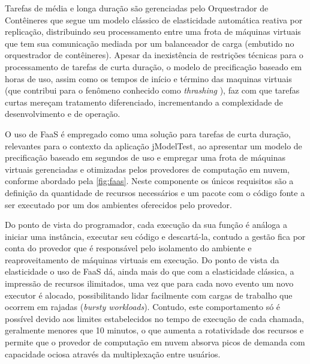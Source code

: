 \documentclass[english,brazilian]{UNISINOSmonografia} %
\begin{document}
Tarefas de média e longa duração são gerenciadas pelo Orquestrador de Contêineres que segue um modelo clássico de elasticidade automática reativa por replicação, distribuindo seu processamento entre uma frota de máquinas virtuais que tem sua comunicação mediada por um balanceador de carga (embutido no orquestrador de contêineres).
Apesar da inexistência de restrições técnicas para o processamento de tarefas de curta duração, o modelo de precificação baseado em horas de uso, assim como os tempos de início e término das maquinas virtuais (que contribui para o fenômeno conhecido como \textit{thrashing} \cite{Bersani2014}), faz com que tarefas curtas mereçam tratamento diferenciado, incrementando a complexidade de desenvolvimento e de operação.


O uso de FaaS é empregado como uma solução para tarefas de curta duração, relevantes para o contexto da aplicação jModelTest, ao apresentar um modelo de precificação baseado em segundos de uso e empregar uma frota de máquinas virtuais gerenciadas e otimizadas pelos provedores de computação em nuvem, conforme abordado pela \autoref{fig:faas}.
Neste componente os únicos requisitos são a definição da quantidade de recursos necessários e um pacote com o código fonte a ser executado por um dos ambientes oferecidos pelo provedor.


Do ponto de vista do programador, cada execução da sua função é análoga a iniciar uma instância, executar seu código e descartá-la, contudo a gestão fica por conta do provedor que é responsável pelo isolamento do ambiente e reaproveitamento de máquinas virtuais em execução.
Do ponto de vista da elasticidade o uso de FaaS dá, ainda mais do que com a elasticidade clássica, a impressão de recursos ilimitados, uma vez que para cada novo evento um novo executor é alocado, possibilitando lidar facilmente com cargas de trabalho que ocorrem em rajadas (\textit{bursty workloads}).
Contudo, este comportamento só é possível devido aos limites estabelecidos no tempo de execução de cada chamada, geralmente menores que 10 minutos, o que aumenta a rotatividade dos recursos e permite que o provedor de computação em nuvem absorva picos de demanda com capacidade ociosa através da multiplexação entre usuários.
\end{document}
